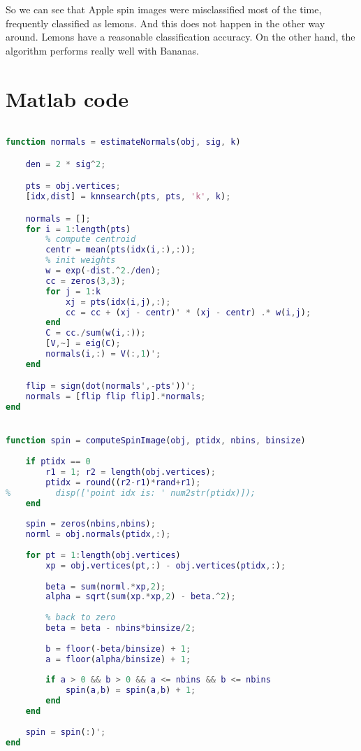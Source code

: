 \documentclass{article}
\begin{document}
So we can see that Apple spin images were misclassified most of the time, frequently classified as lemons. And this does not happen in the other way around. Lemons have a reasonable classification accuracy. On the other hand, the algorithm performs really well with Bananas.


\section{Matlab code}

\begin{lstlisting}[language=matlab]

function normals = estimateNormals(obj, sig, k)

    den = 2 * sig^2;

    pts = obj.vertices;
    [idx,dist] = knnsearch(pts, pts, 'k', k);

    normals = [];
    for i = 1:length(pts)
        % compute centroid
        centr = mean(pts(idx(i,:),:));
        % init weights
        w = exp(-dist.^2./den);
        cc = zeros(3,3);
        for j = 1:k
            xj = pts(idx(i,j),:);
            cc = cc + (xj - centr)' * (xj - centr) .* w(i,j);        
        end
        C = cc./sum(w(i,:));
        [V,~] = eig(C);
        normals(i,:) = V(:,1)';
    end

    flip = sign(dot(normals',-pts'))';
    normals = [flip flip flip].*normals;
end


function spin = computeSpinImage(obj, ptidx, nbins, binsize)
    
    if ptidx == 0
        r1 = 1; r2 = length(obj.vertices);
        ptidx = round((r2-r1)*rand+r1);
%         disp(['point idx is: ' num2str(ptidx)]);
    end
    
    spin = zeros(nbins,nbins);
    norml = obj.normals(ptidx,:);
    
    for pt = 1:length(obj.vertices)
        xp = obj.vertices(pt,:) - obj.vertices(ptidx,:);
        
        beta = sum(norml.*xp,2);
        alpha = sqrt(sum(xp.*xp,2) - beta.^2);
    
        % back to zero
        beta = beta - nbins*binsize/2;
        
        b = floor(-beta/binsize) + 1;
        a = floor(alpha/binsize) + 1;
        
        if a > 0 && b > 0 && a <= nbins && b <= nbins
            spin(a,b) = spin(a,b) + 1;
        end
    end
    
    spin = spin(:)';
end



\end{lstlisting}
\end{document}
